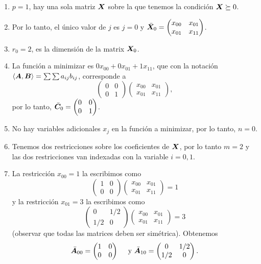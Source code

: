\documentclass[11pt]{article}
\begin{document}
\begin{enumerate}
\item $p = 1$, hay una sola matriz $\bm{X}$ sobre la que tenemos la condición $\bm{X} \succeq 0$.
\item Por lo tanto, el único valor de $j$ es $j = 0$ y $\bar {\bm{X}}_0 = \begin{pmatrix} x_{00} & x_{01} \\ x_{01} & x_{11} \end{pmatrix}$.
\item $r_0 = 2$, es la dimensión de la matrix $\bm{X}_0$.
\item La función a minimizar es $0 x_{00} + 0 x_{01} + 1 x_{11}$, que con la notación $\langle \bm{A}, \bm{B} \rangle = \sum \sum a_{ij} b_{ij}$, corresponde a 
    $$
    \begin{pmatrix} 0 & 0 \\ 0 & 1 \end{pmatrix} \begin{pmatrix} x_{00} & x_{01} \\ x_{01} & x_{11} \end{pmatrix},
    $$
    por lo tanto, $\bar {\bm{C}}_0 = \begin{pmatrix} 0 & 0 \\ 0 & 1 \end{pmatrix}$.
\item No hay variables adicionales $x_j$ en la función a minimizar, por lo tanto, $n = 0$.
\item Tenemos dos restricciones sobre los coeficientes de $\bm{X}$, por lo tanto $m = 2$ y  las dos restricciones van indexadas con la variable $i = 0, 1$.
\item La restricción $x_{00} = 1$ la escribimos como 
$$
\begin{pmatrix} 1 & 0 \\ 0 & 0 \end{pmatrix}
\begin{pmatrix} x_{00} & x_{01} \\ x_{01} & x_{11} \end{pmatrix} = 1
$$
y la restricción $x_{01} = 3$ la escribimos como
$$
\begin{pmatrix} 0 & 1/2 \\ 1/2 & 0 \end{pmatrix}
\begin{pmatrix} x_{00} & x_{01} \\ x_{01} & x_{11} \end{pmatrix} = 3
$$
(observar que todas las matrices deben ser simétrica).
Obtenemos
$$
\bar {\bm{A}}_{00} = \begin{pmatrix} 1 & 0 \\ 0 & 0 \end{pmatrix} \quad \text { y }
\bar {\bm{A}}_{10} = \begin{pmatrix} 0 & 1/2 \\ 1/2 & 0 \end{pmatrix}.
$$
\end{enumerate}
\end{document}
